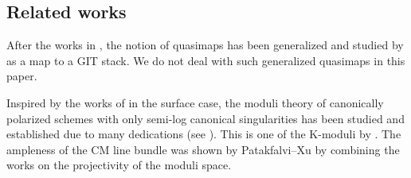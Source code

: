\documentclass[12pt,twoside]{amsart}
\theoremstyle{definition}
\begin{document}

\subsection{Related works}\label{sec--related--works}

After the works in \cite{givental,DP2},
the notion of quasimaps has been generalized and studied by \cite{CFK,CFKM,CCFK} as a map to a GIT stack.
We do not deal with such generalized quasimaps in this paper.

Inspired by the works of \cite{KSB,Al} in the surface case, the moduli theory of canonically polarized schemes with only semi-log canonical singularities has been studied and established due to many dedications (see \cite{kollar-moduli}). This is one of the K-moduli by \cite{O}.
The ampleness of the CM line bundle was shown by Patakfalvi--Xu \cite{PX} by combining the works \cite{kollar-moduli-stable-surface-proj,fujino-semi-positivity,KP} on the projectivity of the moduli space.
\end{document}
